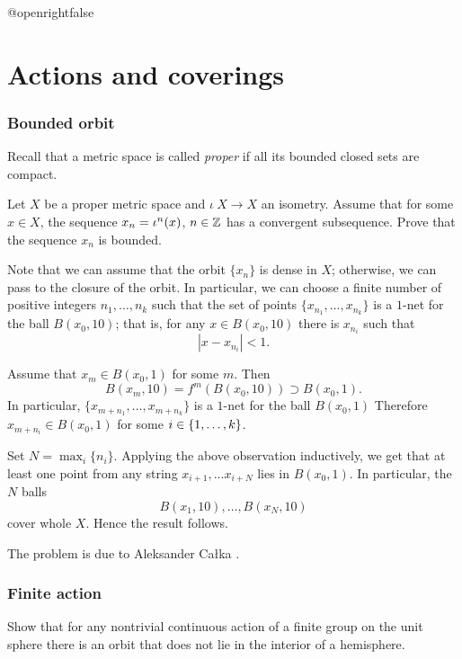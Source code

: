 \csname @openrightfalse\endcsname
\chapter{Actions and coverings}

\subsection*{Bounded orbit}
\label{Bounded orbit}

Recall that a metric space is called \emph{proper} if all its bounded closed sets are compact.

\begin{pr} Let $X$ be a 
proper metric space 
and $\iota\:X\to X$ an isometry.
Assume that for some $x\in X$, the sequence $x_n\z=\iota^n(x)$, $n\in\mathbb{Z}$ has a convergent subsequence.
Prove that the sequence $x_n$ is bounded.
\end{pr}

Note that we can assume that the orbit $\{x_n\}$ is dense in $X$;
otherwise, we can pass to the closure of the orbit.
In particular, we can choose a finite number of positive integers $n_1,\dots,n_k$
such that the set of points $\{x_{n_1},\dots,x_{n_k}\}$ is a $1$-net for the ball $B(x_0,10)$;
that is, for any $x\in B(x_0,10)$ there is $x_{n_i}$ such that
\[|x-x_{n_i}|<1.\]

Assume that $x_m\in B(x_0,1)$ for some $m$.
Then 
\[B(x_m,10)=f^m( B(x_0,10))\supset B(x_0,1).\] 
In particular, $\{x_{m+n_1},\dots,x_{m+n_k}\}$ is a $1$-net for the ball $B(x_0,1)$
Therefore $x_{m+n_i}\in B(x_0,1)$ for some $i\z\in\{1,\dots,k\}$.

Set $N=\max_i\{n_i\}$.
Applying the above observation inductively, we get that at least one point from any string $x_{i+1},\dots x_{i+N}$ lies in $B(x_0,1)$.
In particular, the $N$ balls
\[B(x_1,10),\dots,B(x_N,10)\]
cover whole $X$.
Hence the result follows.\qeds

The problem is due to Aleksander Ca{\l}ka \cite{calka}.

\subsection*{Finite action}\label{Finite action}

\begin{pr}
Show that for any nontrivial continuous action of a finite group on the unit sphere
there is an orbit that does not lie in the interior of a hemisphere.
\end{pr}

